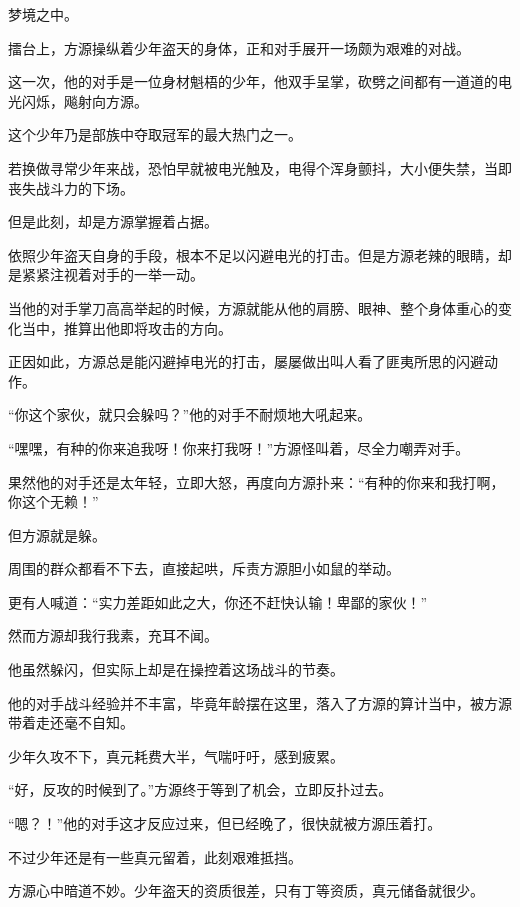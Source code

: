 
\begin{this_body}

梦境之中。

擂台上，方源操纵着少年盗天的身体，正和对手展开一场颇为艰难的对战。

这一次，他的对手是一位身材魁梧的少年，他双手呈掌，砍劈之间都有一道道的电光闪烁，飚射向方源。

这个少年乃是部族中夺取冠军的最大热门之一。

若换做寻常少年来战，恐怕早就被电光触及，电得个浑身颤抖，大小便失禁，当即丧失战斗力的下场。

但是此刻，却是方源掌握着占据。

依照少年盗天自身的手段，根本不足以闪避电光的打击。但是方源老辣的眼睛，却是紧紧注视着对手的一举一动。

当他的对手掌刀高高举起的时候，方源就能从他的肩膀、眼神、整个身体重心的变化当中，推算出他即将攻击的方向。

正因如此，方源总是能闪避掉电光的打击，屡屡做出叫人看了匪夷所思的闪避动作。

“你这个家伙，就只会躲吗？”他的对手不耐烦地大吼起来。

“嘿嘿，有种的你来追我呀！你来打我呀！”方源怪叫着，尽全力嘲弄对手。

果然他的对手还是太年轻，立即大怒，再度向方源扑来：“有种的你来和我打啊，你这个无赖！”

但方源就是躲。

周围的群众都看不下去，直接起哄，斥责方源胆小如鼠的举动。

更有人喊道：“实力差距如此之大，你还不赶快认输！卑鄙的家伙！”

然而方源却我行我素，充耳不闻。

他虽然躲闪，但实际上却是在操控着这场战斗的节奏。

他的对手战斗经验并不丰富，毕竟年龄摆在这里，落入了方源的算计当中，被方源带着走还毫不自知。

少年久攻不下，真元耗费大半，气喘吁吁，感到疲累。

“好，反攻的时候到了。”方源终于等到了机会，立即反扑过去。

“嗯？！”他的对手这才反应过来，但已经晚了，很快就被方源压着打。

不过少年还是有一些真元留着，此刻艰难抵挡。

方源心中暗道不妙。少年盗天的资质很差，只有丁等资质，真元储备就很少。


\end{this_body}
